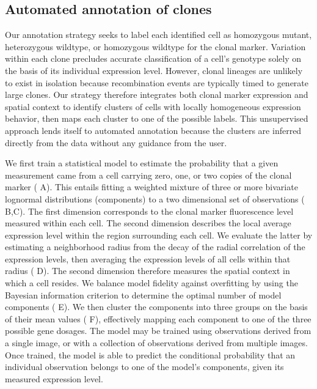 \documentclass[10pt,letterpaper]{article}
\begin{document}
\subsection*{Automated annotation of clones}
\label{ch:annotation}

Our annotation strategy seeks to label each identified cell as homozygous mutant, heterozygous wildtype, or homozygous wildtype for the clonal marker. Variation within each clone precludes accurate classification of a cell's genotype solely on the basis of its individual expression level. However, clonal lineages are unlikely to exist in isolation because recombination events are typically timed to generate large clones. Our strategy therefore integrates both clonal marker expression and spatial context to identify clusters of cells with locally homogeneous expression behavior, then maps each cluster to one of the possible labels. This unsupervised approach lends itself to automated annotation because the clusters are inferred directly from the data without any guidance from the user.

We first train a statistical model to estimate the probability that a given measurement came from a cell carrying zero, one, or two copies of the clonal marker ( A). This entails fitting a weighted mixture of three or more bivariate lognormal distributions (components) to a two dimensional set of observations ( B,C). The first dimension corresponds to the clonal marker fluorescence level measured within each cell. The second dimension describes the local average expression level within the region surrounding each cell. We evaluate the latter by estimating a neighborhood radius from the decay of the radial correlation of the expression levels, then averaging the expression levels of all cells within that radius ( D). The second dimension therefore measures the spatial context in which a cell resides. We balance model fidelity against overfitting by using the Bayesian information criterion to determine the optimal number of model components ( E). We then cluster the components into three groups on the basis of their mean values ( F), effectively mapping each component to one of the three possible gene dosages. The model may be trained using observations derived from a single image, or with a collection of observations derived from multiple images. Once trained, the model is able to predict the conditional probability that an individual observation belongs to one of the model's components, given its measured expression level.
\end{document}
